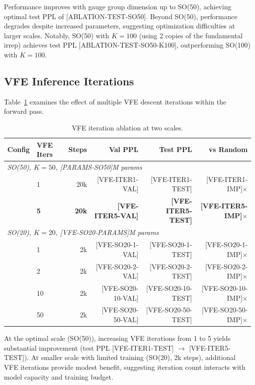 \documentclass[twoside,11pt]{article}
\begin{document}
Performance improves with gauge group dimension up to SO(50), achieving optimal test PPL of [ABLATION-TEST-SO50]. Beyond SO(50), performance degrades despite increased parameters, suggesting optimization difficulties at larger scales. Notably, SO(50) with $K=100$ (using 2 copies of the fundamental irrep) achieves test PPL [ABLATION-TEST-SO50-K100], outperforming SO(100) with $K=100$.

\subsection{VFE Inference Iterations}

Table~\ref{tab:ablation_vfe} examines the effect of multiple VFE descent iterations within the forward pass.

\begin{table}[h]
\centering
\small
\caption{VFE iteration ablation at two scales.}
\label{tab:ablation_vfe}
\begin{tabular}{llrrrr}
\toprule
\textbf{Config} & \textbf{VFE Iters} & \textbf{Steps} & \textbf{Val PPL} & \textbf{Test PPL} & \textbf{vs Random} \\
\midrule
\multicolumn{6}{l}{\textit{SO(50), $K=50$, [PARAMS-SO50]M params}} \\
\quad & 1 & 20k & [VFE-ITER1-VAL] & [VFE-ITER1-TEST] & [VFE-ITER1-IMP]$\times$ \\
\quad & \textbf{5} & \textbf{20k} & \textbf{[VFE-ITER5-VAL]} & \textbf{[VFE-ITER5-TEST]} & \textbf{[VFE-ITER5-IMP]$\times$} \\
\midrule
\multicolumn{6}{l}{\textit{SO(20), $K=20$, [VFE-SO20-PARAMS]M params}} \\
\quad & 1 & 2k & [VFE-SO20-1-VAL] & [VFE-SO20-1-TEST] & [VFE-SO20-1-IMP]$\times$ \\
\quad & 2 & 2k & [VFE-SO20-2-VAL] & [VFE-SO20-2-TEST] & [VFE-SO20-2-IMP]$\times$ \\
\quad & 10 & 2k & [VFE-SO20-10-VAL] & [VFE-SO20-10-TEST] & [VFE-SO20-10-IMP]$\times$ \\
\quad & 50 & 2k & [VFE-SO20-50-VAL] & [VFE-SO20-50-TEST] & [VFE-SO20-50-IMP]$\times$ \\
\bottomrule
\end{tabular}
\end{table}

At the optimal scale (SO(50)), increasing VFE iterations from 1 to 5 yields substantial improvement (test PPL [VFE-ITER1-TEST] $\to$ [VFE-ITER5-TEST]). At smaller scale with limited training (SO(20), 2k steps), additional VFE iterations provide modest benefit, suggesting iteration count interacts with model capacity and training budget.
\end{document}
